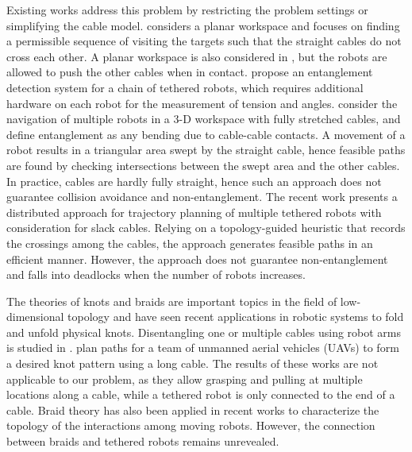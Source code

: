 \documentclass[conference]{IEEEtran}
\begin{document}
Existing works address this problem by restricting the problem settings or simplifying the cable model.
\citet{Sinden1990} considers a planar workspace and focuses on finding a permissible sequence of visiting the targets such that the straight cables do not cross each other.
A planar workspace is also considered in \citet{Zhang2019}, but the robots are allowed to push the other cables when in contact. 
\citet{Rajan2016} propose an entanglement detection system for a chain of tethered robots, which requires additional hardware on each robot for the measurement of tension and angles.
\citet{hert1999motion,hert1996ties} consider the navigation of multiple robots in a 3-D workspace with fully stretched cables, 
and define entanglement as any bending due to cable-cable contacts.
A movement of a robot results in a triangular area swept by the straight cable, hence feasible paths are found by checking intersections between the swept area and the other cables.
In practice, cables are hardly fully straight, hence such an approach does not guarantee collision avoidance and non-entanglement.
The recent work \cite{cao2022neptune} presents a distributed approach for trajectory planning of multiple tethered robots with consideration for slack cables.
Relying on a topology-guided heuristic that records the crossings among the cables, the approach generates feasible paths in an efficient manner.
However, the approach does not guarantee non-entanglement and falls into deadlocks when the number of robots increases.

The theories of knots and braids are important topics in the field of low-dimensional topology \cite{prasolov1997knots} 
and have seen recent applications in robotic systems to fold and unfold physical knots.
Disentangling one or multiple cables using robot arms is studied in \cite{Yan2020,Shivakumar-RSS-22}.
\citet{Antonio2022folding} plan paths for a team of unmanned aerial vehicles (UAVs) to form a desired knot pattern using a long cable.
The results of these works are not applicable to our problem, as they allow grasping and pulling at multiple locations along a cable, while a tethered robot is only connected to the end of a cable.
Braid theory has also been applied in recent works to characterize the topology of the interactions among moving robots\cite{Diaz2017multirobot, Mavrogiannis2019}.
However, the connection between braids and tethered robots remains unrevealed.
\end{document}
